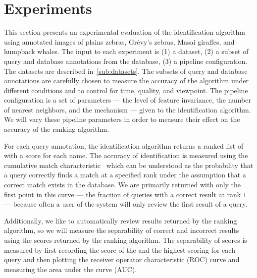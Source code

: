 
\section{Experiments}\label{sec:experiments}

    This section presents an experimental evaluation of the identification algorithm using annotated images of
      plains zebras, Grévy's zebras, Masai giraffes, and humpback whales.
    The input to each experiment is
    (1) a dataset,
    (2) a subset of query and database annotations from the database,
    (3) a pipeline configuration.
    The datasets are described in~\cref{sub:datasets}.
    The subsets of query and database annotations are carefully chosen to measure the accuracy of the algorithm
      under different conditions and to control for time, quality, and viewpoint.
    The pipeline configuration is a set of parameters --- \eg{} the level of feature invariance, the number of
      nearest neighbors, and the \namescoring{} mechanism --- given to the identification algorithm.
    We will vary these pipeline parameters in order to measure their effect on the accuracy of the ranking
      algorithm.

    For each query annotation, the identification algorithm returns a ranked list of \names{} with a score for
      each name.
    The accuracy of identification is measured using the cumulative match
      characteristic~\cite{decann_relating_2013} which can be understood as the probability that a query correctly
      finds a match at a specified rank under the assumption that a correct match exists in the database.
    We are primarily returned with only the first point in this curve --- the fraction of queries with a correct
      result at rank $1$ --- because often a user of the system will only review the first result of a query.

    Additionally, we like to automatically review results returned by the ranking algorithm, so we will measure
      the separability of correct and incorrect results using the scores returned by the ranking algorithm.
    The separability of scores is measured by first recording the score of the \groundtrue{} \name{} and the
      highest scoring \groundfalse{} \name{} for each query and then plotting the receiver operator characteristic
      (ROC) curve and measuring the area under the curve (AUC).

